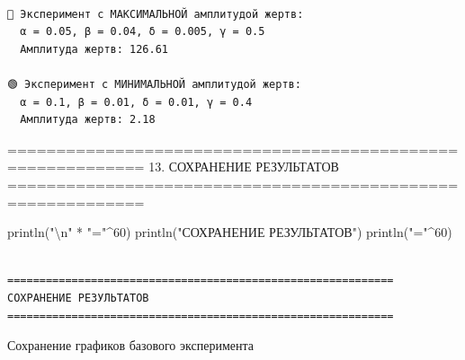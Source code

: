 \documentclass[
  12pt,
  a4paper,
  DIV=11,
  numbers=noendperiod]{scrreprt}
\newenvironment{Shaded}{\begin{snugshade}}{\end{snugshade}}
\newcommand{\FloatTok}[1]{\textcolor[rgb]{0.68,0.00,0.00}{#1}}
\newcommand{\FunctionTok}[1]{\textcolor[rgb]{0.28,0.35,0.67}{#1}}
\newcommand{\NormalTok}[1]{\textcolor[rgb]{0.00,0.23,0.31}{#1}}
\newcommand{\OperatorTok}[1]{\textcolor[rgb]{0.37,0.37,0.37}{#1}}
\newcommand{\SpecialCharTok}[1]{\textcolor[rgb]{0.37,0.37,0.37}{#1}}
\newcommand{\StringTok}[1]{\textcolor[rgb]{0.13,0.47,0.30}{#1}}
\begin{document}
\begin{verbatim}

🔴 Эксперимент с МАКСИМАЛЬНОЙ амплитудой жертв:
  α = 0.05, β = 0.04, δ = 0.005, γ = 0.5
  Амплитуда жертв: 126.61

🟢 Эксперимент с МИНИМАЛЬНОЙ амплитудой жертв:
  α = 0.1, β = 0.01, δ = 0.01, γ = 0.4
  Амплитуда жертв: 2.18
\end{verbatim}

============================================================ 13.
СОХРАНЕНИЕ РЕЗУЛЬТАТОВ
============================================================

\begin{Shaded}
\begin{Highlighting}[]
\FunctionTok{println}\NormalTok{(}\StringTok{"}\SpecialCharTok{\textbackslash{}n}\StringTok{"} \OperatorTok{*} \StringTok{"="}\OperatorTok{\^{}}\FloatTok{60}\NormalTok{)}
\FunctionTok{println}\NormalTok{(}\StringTok{"СОХРАНЕНИЕ РЕЗУЛЬТАТОВ"}\NormalTok{)}
\FunctionTok{println}\NormalTok{(}\StringTok{"="}\OperatorTok{\^{}}\FloatTok{60}\NormalTok{)}
\end{Highlighting}
\end{Shaded}

\begin{verbatim}

============================================================
СОХРАНЕНИЕ РЕЗУЛЬТАТОВ
============================================================
\end{verbatim}

Сохранение графиков базового эксперимента

\begin{Shaded}
\end{Shaded}
\end{document}
